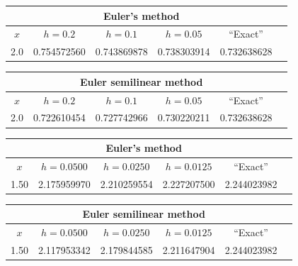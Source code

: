 \bigskip

{\small
\begin{tabular}{|c|r|r|r|r|r|}
\hline
\multicolumn{5}{|c|}{Euler's method}\\\hline
\multicolumn{1}{|c|}{$x$}&
\multicolumn{1}{|c|}{$h=0.2$}&
\multicolumn{1}{|c|}{$h=0.1$}&
\multicolumn{1}{|c|}{$h=0.05$}&
\multicolumn{1}{|c|}{``Exact''}\\ \hline
2.0 & 0.754572560 & 0.743869878 & 0.738303914 & 0.732638628 \\
\hline
\end{tabular}}

\bigskip

\hspace{.75in}
{\small
\begin{tabular}{|c|r|r|r|r|r|}
\hline
\multicolumn{5}{|c|}{Euler semilinear method}\\\hline
\multicolumn{1}{|c|}{$x$}&
\multicolumn{1}{|c|}{$h=0.2$}&
\multicolumn{1}{|c|}{$h=0.1$}&
\multicolumn{1}{|c|}{$h=0.05$}&
\multicolumn{1}{|c|}{``Exact''}\\ \hline
2.0 & 0.722610454 & 0.727742966 & 0.730220211 & 0.732638628 \\
\hline
\end{tabular}}

\bigskip
{}
{\small
\begin{tabular}{|c|r|r|r|r|r|}
\hline
\multicolumn{5}{|c|}{Euler's method}\\\hline
\multicolumn{1}{|c|}{$x$}&
\multicolumn{1}{|c|}{$h=0.0500$}&
\multicolumn{1}{|c|}{$h=0.0250$}&
\multicolumn{1}{|c|}{$h=0.0125$}&
\multicolumn{1}{|c|}{``Exact''}\\ \hline
1.50 & 2.175959970 & 2.210259554 & 2.227207500 & 2.244023982 \\
\hline
\end{tabular}}

\bigskip

\hspace{.75in}
{\small
\begin{tabular}{|c|r|r|r|r|r|}
\hline
\multicolumn{5}{|c|}{Euler semilinear method}\\\hline
\multicolumn{1}{|c|}{$x$}&
\multicolumn{1}{|c|}{$h=0.0500$}&
\multicolumn{1}{|c|}{$h=0.0250$}&
\multicolumn{1}{|c|}{$h=0.0125$}&
\multicolumn{1}{|c|}{``Exact''}\\ \hline
1.50 & 2.117953342 & 2.179844585 & 2.211647904 & 2.244023982 \\
\hline
\end{tabular}}

